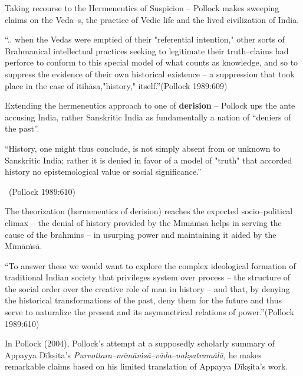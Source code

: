 Taking recourse to the Hermeneutics of Suspicion – Pollock makes sweeping claims on the Veda–s, the practice of Vedic life and the lived civilization of India.

\begin{myquote}
“.. when the Vedas were emptied of their "referential intention," other sorts of Brahmanical intellectual practices seeking to legitimate their truth–claims had perforce to conform to this special model of what counts as knowledge, and so to suppress the evidence of their own historical existence – a suppression that took place in the case of itihāsa,"history," itself.”\hfill (Pollock 1989:609)
\end{myquote}

Extending the hermeneutics approach to one of \textbf{derision }– Pollock ups the ante accusing India, rather Sanskritic India as fundamentally a nation of “deniers of the past”.

\begin{myquote}
“History, one might thus conclude, is not simply absent from or unknown to Sanskritic India; rather it is denied in favor of a model of "truth" that accorded history no epistemological value or social significance.”

~\hfill (Pollock 1989:610)
\end{myquote}

The theorization (hermeneutics of derision) reaches the expected socio–political climax – the denial of history provided by the Mīmāṁsā helps in serving the cause of the brahmins – in usurping power and maintaining it aided by the Mīmāṁsā.

\smallskip

\begin{myquote}
“To answer these we would want to explore the complex ideological formation of traditional Indian society that privileges system over process – the structure of the social order over the creative role of man in history – and that, by denying the historical transformations of the past, deny them for the future and thus serve to naturalize the present and its asymmetrical relations of power.”\hfill (Pollock 1989:610)
\end{myquote}

\smallskip

In Pollock (2004), Pollock’s attempt at a supposedly scholarly summary of Appayya Dīkṣita’s \textit{Purvottara–mīmāṁsā–vāda–nakṣatramālā,} he makes remarkable claims based on his limited translation of Appayya Dīkṣita’s work.

